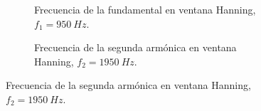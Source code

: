        \begin{figure}[H]
        \centering
        \begin{subfigure}[H]{0.48\textwidth}
          \caption{Frecuencia de la fundamental en ventana Hanning, $f_{1}=950~Hz$.}
        \end{subfigure}
        \hfill
        \begin{subfigure}[H]{0.48\textwidth}
          \caption{Frecuencia de la segunda armónica en ventana Hanning, $f_{2}=1950~Hz$.}

\end{subfigure}
\end{figure}
